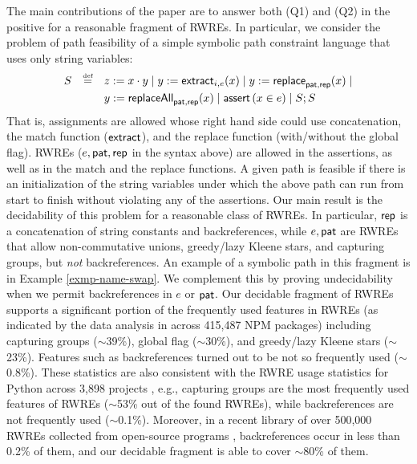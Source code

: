 The main contributions of the paper are to answer both (Q1) and (Q2) in the
positive for a reasonable fragment of RWREs. In particular, we consider the 
problem of path feasibility of a simple symbolic path constraint language
that uses only string variables:
\[
\begin{array}{l c l}
\smallskip
S & \eqdef  & z:= x \concat y \mid y := \extract_{i, e}(x) \mid  
y := \replace_{\pat, \rep}(x) \mid \\
& & y := \replaceall_{\pat, \rep}(x)   \mid 
 \ASSERT{x \in e} \mid S; S\
\end{array}
\]
That is, assignments are allowed whose right hand side could use concatenation,
the match function ($\mathsf{extract}$), and the replace function (with/without the 
global flag). RWREs ($e,\mathsf{pat},\mathsf{rep}$ in the syntax above) are allowed in the 
assertions, as well as in the match and the replace functions. A given path is
feasible if there is an initialization of the string variables under which the above
path can run from start to finish without violating any of the assertions.
Our main result is the decidability of this problem for a reasonable class of
RWREs. In particular, $\mathsf{rep}$ is a concatenation of string 
constants and backreferences, while $e, \mathsf{pat}$ are RWREs that allow non-commutative
unions, greedy/lazy Kleene stars, and capturing groups, but \emph{not} 
backreferences.  An example of a symbolic path in this fragment is in
Example \ref{exmp-name-swap}.
We complement this by proving undecidability when we permit
backreferences in $e$ or $\mathsf{pat}$.
Our decidable fragment of RWREs supports a significant portion of the 
frequently used features in RWREs (as indicated by the data analysis in
\cite{LMK19} across 415,487 NPM packages) including capturing groups ($\sim$39\%), 
global flag ($\sim$30\%), and greedy/lazy Kleene stars ($\sim$23\%). Features
such as backreferences turned out to be not so frequently used ($\sim$0.8\%).
These statistics are also consistent with the RWRE usage statistics for Python across
3,898 projects \cite{CS16}, e.g., capturing groups are the most frequently used
features of RWREs ($\sim$53\% out of the found RWREs), while backreferences are
not frequently used ($\sim$0.1\%). Moreover, in a recent library of over 500,000 RWREs collected from open-source programs \cite{DMC+19},  backreferences occur in less than 0.2\% of them, and our decidable fragment is able to cover $\sim$80\% of them.

